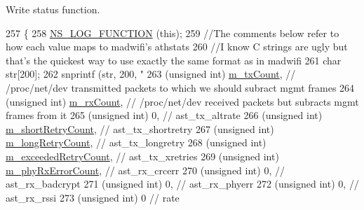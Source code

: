 Write status function. 


\begin{DoxyCode}
257 \{
258   \hyperlink{log-macros-disabled_8h_a90b90d5bad1f39cb1b64923ea94c0761}{NS\_LOG\_FUNCTION} (\textcolor{keyword}{this});
259   \textcolor{comment}{//The comments below refer to how each value maps to madwifi's athstats}
260   \textcolor{comment}{//I know C strings are ugly but that's the quickest way to use exactly the same format as in madwifi}
261   \textcolor{keywordtype}{char} str[200];
262   snprintf (str, 200, \textcolor{stringliteral}{"%
263             (\textcolor{keywordtype}{unsigned} \textcolor{keywordtype}{int}) \hyperlink{classns3_1_1AthstatsWifiTraceSink_a345943653ca6423c98ecfa5c9869e6e3}{m\_txCount}, \textcolor{comment}{// /proc/net/dev transmitted packets to which we should
       subract mgmt frames}
264             (\textcolor{keywordtype}{unsigned} \textcolor{keywordtype}{int}) \hyperlink{classns3_1_1AthstatsWifiTraceSink_a4ecf47643c96e60bd3e44261abb6da30}{m\_rxCount}, \textcolor{comment}{// /proc/net/dev received packets but subracts mgmt frames
       from it}
265             (\textcolor{keywordtype}{unsigned} \textcolor{keywordtype}{int}) 0, \textcolor{comment}{// ast\_tx\_altrate}
266             (\textcolor{keywordtype}{unsigned} \textcolor{keywordtype}{int}) \hyperlink{classns3_1_1AthstatsWifiTraceSink_a584e045801863c0129814a9cbdb84044}{m\_shortRetryCount}, \textcolor{comment}{// ast\_tx\_shortretry}
267             (\textcolor{keywordtype}{unsigned} \textcolor{keywordtype}{int}) \hyperlink{classns3_1_1AthstatsWifiTraceSink_a82893101ecd74542f7860fdf96df9ba5}{m\_longRetryCount}, \textcolor{comment}{// ast\_tx\_longretry}
268             (\textcolor{keywordtype}{unsigned} \textcolor{keywordtype}{int}) \hyperlink{classns3_1_1AthstatsWifiTraceSink_ad6a3eab7b3064fbcaac07d7f476448a9}{m\_exceededRetryCount}, \textcolor{comment}{// ast\_tx\_xretries}
269             (\textcolor{keywordtype}{unsigned} \textcolor{keywordtype}{int}) \hyperlink{classns3_1_1AthstatsWifiTraceSink_ac05a02e26c52753fcbb45885326d9bab}{m\_phyRxErrorCount},    \textcolor{comment}{// ast\_rx\_crcerr}
270             (\textcolor{keywordtype}{unsigned} \textcolor{keywordtype}{int}) 0, \textcolor{comment}{// ast\_rx\_badcrypt}
271             (\textcolor{keywordtype}{unsigned} \textcolor{keywordtype}{int}) 0, \textcolor{comment}{// ast\_rx\_phyerr}
272             (\textcolor{keywordtype}{unsigned} \textcolor{keywordtype}{int}) 0, \textcolor{comment}{// ast\_rx\_rssi}
273             (\textcolor{keywordtype}{unsigned} \textcolor{keywordtype}{int}) 0 \textcolor{comment}{// rate}
}
\end{DoxyCode}
